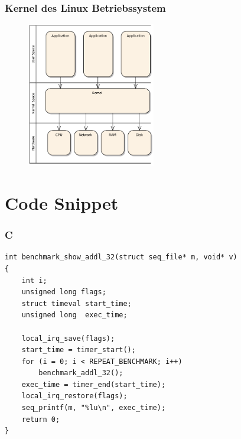 \documentclass{beamer}
\begin{document}
\begin{frame}
\frametitle{Kernel des Linux Betriebssystem}
\begin{figure}[H]
\centering
\includegraphics[width=0.5\textwidth]{../thesis/images/kernel.pdf}
\end{figure}
\end{frame}



\section{Code Snippet} 
\begin{frame}[fragile]
\frametitle{C} 

\begin{lstlisting}
int benchmark_show_addl_32(struct seq_file* m, void* v)
{
    int i;
    unsigned long flags;
    struct timeval start_time;
    unsigned long  exec_time;

    local_irq_save(flags);
    start_time = timer_start();
    for (i = 0; i < REPEAT_BENCHMARK; i++)
        benchmark_addl_32();
    exec_time = timer_end(start_time);
    local_irq_restore(flags);
    seq_printf(m, "%lu\n", exec_time);
    return 0;
}


\end{lstlisting}

\end{frame}
\end{document}
